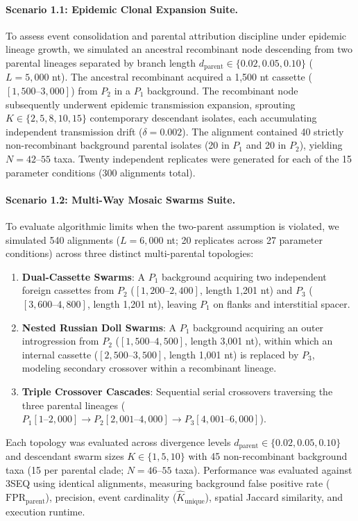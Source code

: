 \paragraph{Scenario 1.1: Epidemic Clonal Expansion Suite.}
To assess event consolidation and parental attribution discipline under epidemic lineage growth, we simulated an ancestral recombinant node descending from two parental lineages separated by branch length $d_{\text{parent}} \in \{0.02, 0.05, 0.10\}$ ($L = 5,000$ nt).
The ancestral recombinant acquired a 1,500 nt cassette ($[1,500\text{--}3,000]$) from $P_2$ in a $P_1$ background.
The recombinant node subsequently underwent epidemic transmission expansion, sprouting $K \in \{2, 5, 8, 10, 15\}$ contemporary descendant isolates, each accumulating independent transmission drift ($\delta = 0.002$).
The alignment contained 40 strictly non-recombinant background parental isolates (20 in $P_1$ and 20 in $P_2$), yielding $N = 42\text{--}55$ taxa.
Twenty independent replicates were generated for each of the 15 parameter conditions (300 alignments total).

\paragraph{Scenario 1.2: Multi-Way Mosaic Swarms Suite.}
To evaluate algorithmic limits when the two-parent assumption is violated, we simulated 540 alignments ($L = 6,000$ nt; 20 replicates across 27 parameter conditions) across three distinct multi-parental topologies:
\begin{enumerate}
\item \textbf{Dual-Cassette Swarms}: A $P_1$ background acquiring two independent foreign cassettes from $P_2$ ($[1,200\text{--}2,400]$, length 1,201 nt) and $P_3$ ($[3,600\text{--}4,800]$, length 1,201 nt), leaving $P_1$ on flanks and interstitial spacer.
\item \textbf{Nested Russian Doll Swarms}: A $P_1$ background acquiring an outer introgression from $P_2$ ($[1,500\text{--}4,500]$, length 3,001 nt), within which an internal cassette ($[2,500\text{--}3,500]$, length 1,001 nt) is replaced by $P_3$, modeling secondary crossover within a recombinant lineage.
\item \textbf{Triple Crossover Cascades}: Sequential serial crossovers traversing the three parental lineages ($P_1 [1\text{--}2,000] \to P_2 [2,001\text{--}4,000] \to P_3 [4,001\text{--}6,000]$).
\end{enumerate}
Each topology was evaluated across divergence levels $d_{\text{parent}} \in \{0.02, 0.05, 0.10\}$ and descendant swarm sizes $K \in \{1, 5, 10\}$ with 45 non-recombinant background taxa (15 per parental clade; $N = 46\text{--}55$ taxa).
Performance was evaluated against 3SEQ using identical alignments, measuring background false positive rate ($\text{FPR}_{\text{parent}}$), precision, event cardinality ($\hat{K}_{\text{unique}}$), spatial Jaccard similarity, and execution runtime.

